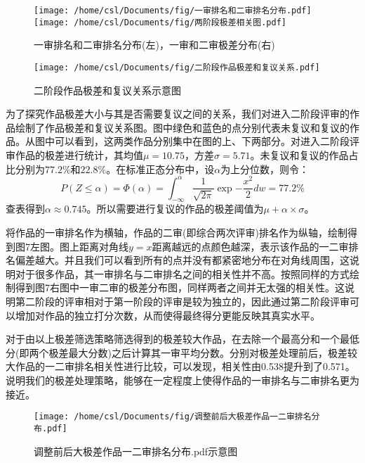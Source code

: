 \documentclass[12pt, onecolumn]{article}
\newcommand\normf{\fangsong}
\begin{document}
	\begin{figure}[h]
		\centering
		\texttt{[image: /home/csl/Documents/fig/一审排名和二审排名分布.pdf]}
		\texttt{[image: /home/csl/Documents/fig/两阶段极差相关图.pdf]}
		\caption{\normf 一审排名和二审排名分布(左)，一审和二审极差分布(右)}
	\end{figure}

		\begin{figure}[h]
		\centering
		\texttt{[image: /home/csl/Documents/fig/二阶段作品极差和复议关系.pdf]}
		\caption{\normf 二阶段作品极差和复议关系示意图}
	\end{figure}
	为了探究作品极差大小与其是否需要复议之间的关系，我们对进入二阶段评审的作品绘制了作品极差和复议关系图。图中绿色和蓝色的点分别代表未复议和复议的作品。从图中可以看到，这两类作品分别集中在图的上、下两部分。对进入二阶段评审作品的极差进行统计，其均值$\mu=10.75$，方差$\sigma=5.71$。未复议和复议的作品占比分别为$77.2\%$和$22.8\%$。在标准正态分布中，设$\alpha$为上分位数，则令：
	\begin{equation*}
	P(Z\le \alpha)=\Phi(\alpha)=\int_{-\infty}^{\alpha}\frac{1}{\sqrt{2\pi}}\exp{-\frac{x^2}{2}}dw=77.2\%
	\end{equation*}
	查表得到$\alpha\approx 0.745$。所以需要进行复议的作品的极差阈值为$\mu+\alpha\times\sigma$。
	
	将作品的一审排名作为横轴，作品的二审(即综合两次评审)排名作为纵轴，绘制得到图7左图。图上距离对角线$y=x$距离越远的点颜色越深，表示该作品的一二审排名偏差越大。并且我们可以看到所有的点并没有都紧密地分布在对角线周围，这说明对于很多作品，其一审排名与二审排名之间的相关性并不高。按照同样的方式绘制得到图7右图中一审二审的极差分布图，同样两者之间并无太强的相关性。这说明第二阶段的评审相对于第一阶段的评审是较为独立的，因此通过第二阶段评审可以增加对作品的独立打分次数，从而使得最终得分更能反映其真实水平。

	对于由以上极差筛选策略筛选得到的极差较大作品，在去除一个最高分和一个最低分(即两个极差最大分数)之后计算其一审平均分数。分别对极差处理前后，极差较大作品的一二审排名相关性进行比较，可以发现，相关性由0.538提升到了0.571。说明我们的极差处理策略，能够在一定程度上使得作品的一审排名与二审排名更为接近。
	
			\begin{figure}[h]
		\centering
		\texttt{[image: /home/csl/Documents/fig/调整前后大极差作品一二审排名分布.pdf]}
		\caption{\normf 调整前后大极差作品一二审排名分布.pdf示意图}
	\end{figure}
	
	
	
	
	
	
	
	
	
	
	
	
	
	
	
	
	
	
	
	
	
	
	
	
	
	
	
	
	
	
	
	
	
	
	
	
	
	
	
	
	
	
	
	
	
	
	
	
\end{document}
